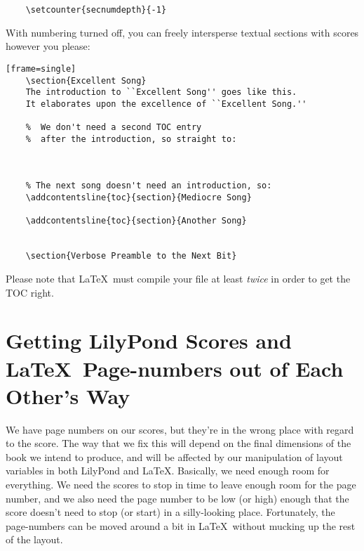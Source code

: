 \documentclass[../../LilyPond-Tutorials]{subfiles}
\begin{document}
\begin{verbatim}
	\setcounter{secnumdepth}{-1}
\end{verbatim}

With  numbering turned off, you can freely intersperse textual sections with scores however you please:

\begin{verbatim}[frame=single] 
	\section{Excellent Song} 
	The introduction to ``Excellent Song'' goes like this. 
	It elaborates upon the excellence of ``Excellent Song.'' 
	
	%  We don't need a second TOC entry  
	%  after the introduction, so straight to: 
	
	
	
	% The next song doesn't need an introduction, so: 
	\addcontentsline{toc}{section}{Mediocre Song} 
	 
	\addcontentsline{toc}{section}{Another Song} 
	
	
	\section{Verbose Preamble to the Next Bit}
\end{verbatim}

Please note that \LaTeX\ must compile your file at least \textit{twice} in order to get the TOC right. 

\section{Getting LilyPond Scores and \LaTeX\ Page-numbers out of Each Other's Way}

We have page numbers on our scores, but they're in the wrong place with regard to the score. 
The way that we fix this will depend on the final dimensions of the book we intend to produce, and will be affected by our manipulation of layout variables in both LilyPond and \LaTeX. 
Basically, we need enough room for everything. 
We need the scores to stop in time to leave enough room for the page number, and we also need the page number to be low (or high) enough that the score doesn’t need to stop (or start) in a silly-looking place. 
Fortunately, the page-numbers can be moved around a bit in \LaTeX\ without mucking up the rest of the layout.
\end{document}
